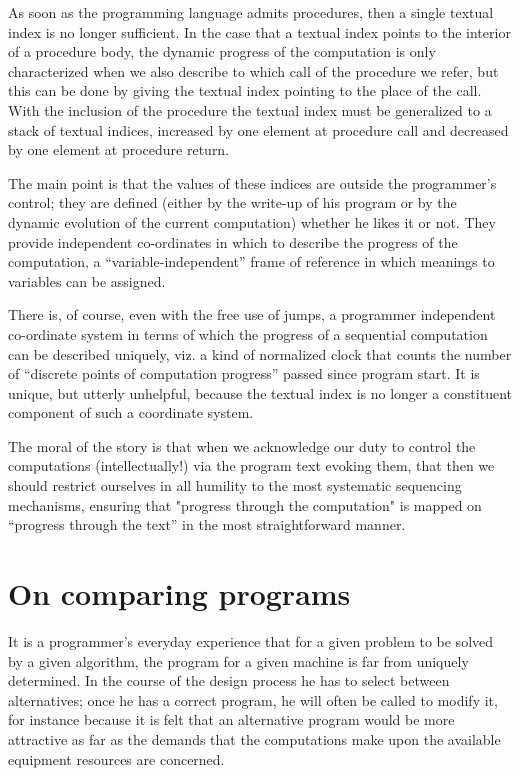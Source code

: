 As soon as the programming language admits procedures, then a single textual index is no longer sufficient. In the case that a textual index points to the interior of a procedure body, the dynamic progress of the computation is only characterized when we also describe to which call of the procedure we refer, but this can be done by giving the textual index pointing to the place of the call. With the inclusion of the procedure the textual index must be generalized to a stack of textual indices, increased by one element at procedure call and decreased by one element at procedure return.

The main point is that the values of these indices are outside the programmer's control; they are defined (either by the write-up of his program or by the dynamic evolution of the current computation) whether he likes it or not. They provide independent co-ordinates in which to describe the progress of the computation, a ``variable-independent'' frame of reference in which meanings to variables can be assigned.

There is, of course, even with the free use of jumps, a programmer independent co-ordinate system in terms of which the progress of a sequential computation can be described uniquely, viz. a kind of normalized clock that counts the number of ``discrete points of computation progress'' passed since program start. It is unique, but utterly unhelpful, because the textual index is no longer a constituent component of such a coordinate system.

The moral of the story is that when we acknowledge our duty to control the computations (intellectually!) via the program text evoking them, that then we should restrict ourselves in all humility to the most systematic sequencing mechanisms, ensuring that "progress through the computation" is mapped on ``progress through the text'' in the most straightforward manner.

\section{On comparing programs}

It is a programmer's everyday experience that for a given problem to be solved by a given algorithm, the program for a given machine is far from uniquely determined. In the course of the design process he has to select between alternatives; once he has a correct program, he will often be called to modify it, for instance because it is felt that an alternative program would be more attractive as far as the demands that the computations make upon the available equipment resources are concerned.

